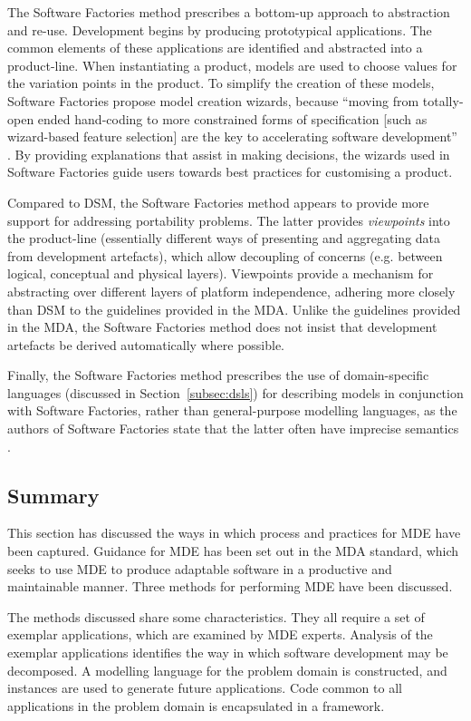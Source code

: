 The Software Factories method \cite{greenfield04software} prescribes a bottom-up approach to abstraction and re-use. Development begins by producing prototypical applications. The common elements of these applications are identified and abstracted into a product-line. When instantiating a product, models are used to choose values for the variation points in the product. To simplify the creation of these models, Software Factories propose model creation wizards, because ``moving from totally-open ended hand-coding to more constrained forms of specification [such as wizard-based feature selection] are the key to accelerating software development'' \cite[pg179]{greenfield04software}. By providing explanations that assist in making decisions, the wizards used in Software Factories guide users towards best practices for customising a product.

Compared to DSM, the Software Factories method appears to provide more support for addressing portability problems. The latter provides \textit{viewpoints} into the product-line (essentially different ways of presenting and aggregating data from development artefacts), which allow decoupling of concerns (e.g. between logical, conceptual and physical layers). Viewpoints provide a mechanism for abstracting over different layers of platform independence, adhering more closely than DSM to the guidelines provided in the MDA. Unlike the guidelines provided in the MDA, the Software Factories method does not insist that development artefacts be derived automatically where possible.

Finally, the Software Factories method prescribes the use of domain-specific languages (discussed in Section~\ref{subsec:dsls}) for describing models in conjunction with Software Factories, rather than general-purpose modelling languages, as the authors of Software Factories state that the latter often have imprecise semantics \cite{greenfield04software}.

\subsection{Summary}
This section has discussed the ways in which process and practices for MDE have been captured. Guidance for MDE has been set out in the MDA standard, which seeks to use MDE to produce adaptable software in a productive and maintainable manner. Three methods for performing MDE have been discussed.
 
The methods discussed share some characteristics. They all require a set of exemplar applications, which are examined by MDE experts. Analysis of the exemplar applications identifies the way in which software development may be decomposed. A modelling language for the problem domain is constructed, and instances are used to generate future applications. Code common to all applications in the problem domain is encapsulated in a framework.

